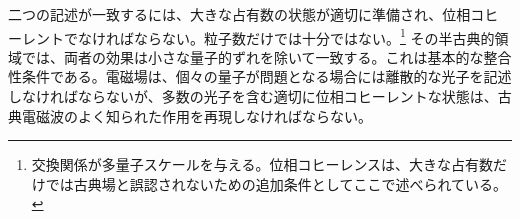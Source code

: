 \begin{classroomqa}
\end{classroomqa}

二つの記述が一致するには、大きな占有数の状態が適切に準備され、位相コヒーレントでなければならない。粒子数だけでは十分ではない。\footnote{交換関係が多量子スケールを与える。位相コヒーレンスは、大きな占有数だけでは古典場と誤認されないための追加条件としてここで述べられている。} その半古典的領域では、両者の効果は小さな量子的ずれを除いて一致する。これは基本的な整合性条件である。電磁場は、個々の量子が問題となる場合には離散的な光子を記述しなければならないが、多数の光子を含む適切に位相コヒーレントな状態は、古典電磁波のよく知られた作用を再現しなければならない。
